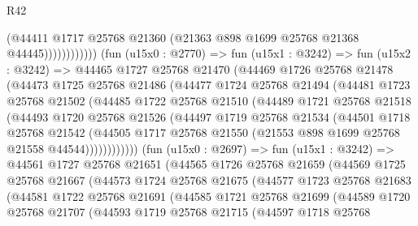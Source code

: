 \begin{lexlean}{R42}
\begin{coremodule}
                            (@44411
                              @1717
                              @25768
                              @21360
                              (@21363 @898 @1699 @25768 @21368 @44445))))))))))))
        (fun (u15x0 : @2770) =>
        fun (u15x1 : @3242) =>
        fun (u15x2 : @3242) =>
        @44465
          @1727
          @25768
          @21470
          (@44469
            @1726
            @25768
            @21478
            (@44473
              @1725
              @25768
              @21486
              (@44477
                @1724
                @25768
                @21494
                (@44481
                  @1723
                  @25768
                  @21502
                  (@44485
                    @1722
                    @25768
                    @21510
                    (@44489
                      @1721
                      @25768
                      @21518
                      (@44493
                        @1720
                        @25768
                        @21526
                        (@44497
                          @1719
                          @25768
                          @21534
                          (@44501
                            @1718
                            @25768
                            @21542
                            (@44505
                              @1717
                              @25768
                              @21550
                              (@21553 @898 @1699 @25768 @21558 @44544))))))))))))
        (fun (u15x0 : @2697) =>
        fun (u15x1 : @3242) =>
        @44561
          @1727
          @25768
          @21651
          (@44565
            @1726
            @25768
            @21659
            (@44569
              @1725
              @25768
              @21667
              (@44573
                @1724
                @25768
                @21675
                (@44577
                  @1723
                  @25768
                  @21683
                  (@44581
                    @1722
                    @25768
                    @21691
                    (@44585
                      @1721
                      @25768
                      @21699
                      (@44589
                        @1720
                        @25768
                        @21707
                        (@44593
                          @1719
                          @25768
                          @21715
                          (@44597
                            @1718
                            @25768

\end{coremodule}
\end{lexlean}
